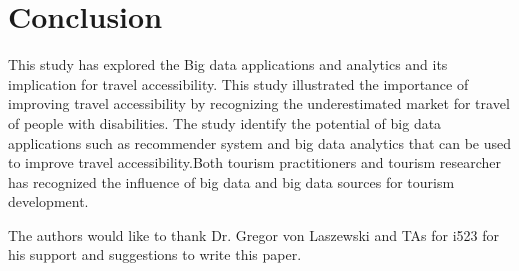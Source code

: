 \section{Conclusion}

This study has explored the Big data applications and analytics and its implication  for travel accessibility. This study illustrated the importance of improving travel accessibility by recognizing the underestimated market for travel of people with disabilities. The study identify the potential of big data applications such as recommender system and big data analytics that can be used to improve travel accessibility.Both tourism practitioners and tourism researcher has recognized the
influence of big data and big data sources for tourism development. 


\begin{acks}

  The authors would like to thank Dr. Gregor von Laszewski and TAs for i523 for his
  support and suggestions to write this paper.

\end{acks}


 

\appendix
